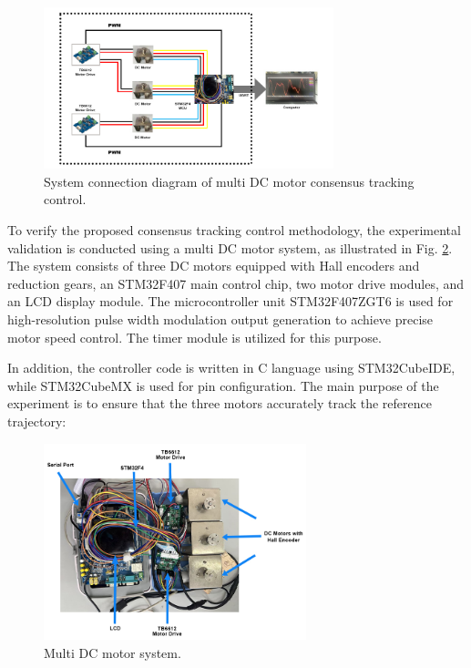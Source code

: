 \documentclass[journal,onecolumn]{IEEEtran}
\begin{document}
\begin{figure}[H]
    \centering
    \includegraphics[width=0.75\textwidth]{diagram.jpg}
    \caption{System connection diagram of multi DC motor consensus tracking control.}
    \label{fig:system_diagram} %
\end{figure}

To verify the proposed consensus tracking control methodology, the experimental validation is conducted using a multi DC motor system, as illustrated in Fig. \ref{fig:system}. The system consists of three DC motors equipped with Hall encoders and reduction
gears, an STM32F407 main control chip, two motor drive modules, and an LCD display module. The microcontroller unit STM32F407ZGT6 is used for high-resolution pulse width modulation output generation to achieve precise motor speed control. The timer module is utilized for this purpose.

In addition, the controller code is written in C language using STM32CubeIDE, while STM32CubeMX is used for pin configuration. The main purpose of the experiment is to ensure that the three motors accurately track the reference trajectory:

\begin{figure}[H]
    \centering
    \includegraphics[width=0.68\textwidth]{system.jpg}
    \caption{Multi DC motor system.}
    \label{fig:system} %
\end{figure}
\end{document}
